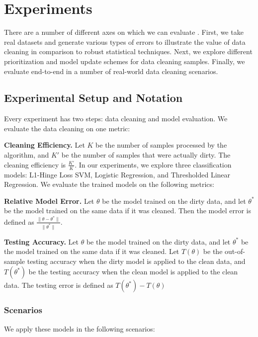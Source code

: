 \section{Experiments}
There are a number of different axes on which we can evaluate \sys.
First, we take real datasets and generate various types of errors to illustrate the value of data cleaning in comparison to robust statistical techniques.
Next, we explore different prioritization and model update schemes for data cleaning samples.
Finally, we evaluate \sys end-to-end in a number of real-world data cleaning scenarios.

\subsection{Experimental Setup and Notation}
Every experiment has two steps: data cleaning and model evaluation.
We evaluate the data cleaning on one metric:

\vspace{0.5em}

\noindent\textbf{Cleaning Efficiency. } Let $K$ be the number of samples processed by the algorithm, and $K'$ be the number of samples that were actually dirty. 
The cleaning efficiency is $\frac{K'}{K}$.
In our experiments, we explore three classification models: L1-Hinge Loss SVM, Logistic Regression, and Thresholded Linear Regression.
We evaluate the trained models on the following metrics:

\vspace{0.5em}

\noindent\textbf{Relative Model Error. } Let $\theta$ be the model trained on the dirty data, and let $\theta^*$ be the model trained on the same data if it was cleaned. Then the model error is defined as $\frac{\|\theta - \theta^*\|}{\|\theta^*\|}$.

\vspace{0.5em}

\noindent\textbf{Testing Accuracy. } Let $\theta$ be the model trained on the dirty data, and let $\theta^*$ be the model trained on the same data if it was cleaned. Let $T(\theta)$ be the out-of-sample testing accuracy when the dirty model is applied to the clean data, and $T(\theta^*)$ be the testing accuracy when the clean model is applied to the clean data. The testing error is defined as $T(\theta^*) - T(\theta)$

\subsubsection{Scenarios}
We apply these models in the following scenarios:

